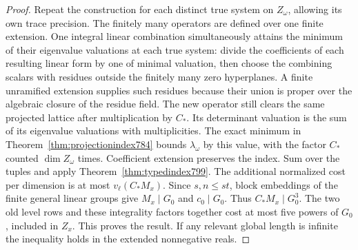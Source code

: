 \documentclass[a4paper,11pt]{article}
\theoremstyle{definition}
\theoremstyle{remark}
\numberwithin{equation}{section}
\begin{document}
\begin{proof}
Repeat the construction for each distinct true system on
\(Z_\omega\), allowing its own trace precision. The finitely many
operators are defined over one finite extension. One integral
linear combination simultaneously attains the minimum of their
eigenvalue valuations at each true system: divide the coefficients
of each resulting linear form by one of minimal valuation, then
choose the combining scalars with residues outside the finitely
many zero hyperplanes. A finite unramified extension supplies
such residues because their union is proper over the algebraic
closure of the residue field. The new operator still clears the
same projected lattice after multiplication by \(C_*\). Its
determinant valuation is the sum of its eigenvalue valuations
with multiplicities. The exact minimum in
Theorem~\ref{thm:projectionindex784} bounds \(\lambda_\omega\)
by this value, with the factor \(C_*\) counted
\(\dim Z_\omega\) times. Coefficient extension preserves the
index. Sum over the tuples and apply Theorem~\ref{thm:typedindex799}.
The additional normalized cost per dimension is at most
\(v_\ell(C_*M_x)\). Since \(s,n\le st\), block embeddings
of the finite general linear groups give \(M_x\mid G_0\) and
\(c_0\mid G_0\). Thus \(C_*M_x\mid G_0^3\). The two old level
rows and these integrality factors together cost at most five
powers of \(G_0\), included in \(Z_x\). This proves the result.
If any relevant global length is infinite the inequality holds
in the extended nonnegative reals.
\end{proof}
\end{document}
